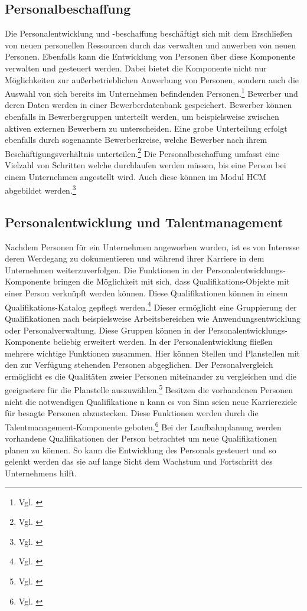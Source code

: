 \subsection{Personalbeschaffung}
Die Personalentwicklung und -beschaffung beschäftigt sich mit dem Erschließen von neuen personellen Ressourcen durch das verwalten und anwerben von neuen Personen.
Ebenfalls kann die Entwicklung von Personen über diese Komponente verwalten und gesteuert werden.
Dabei bietet die Komponente nicht nur Möglichkeiten zur außerbetrieblichen Anwerbung von Personen, sondern auch die Auswahl von sich bereits im Unternehmen befindenden Personen.\footnote{Vgl. \cite{SSSUM2019a}}
Bewerber und deren Daten werden in einer Bewerberdatenbank gespeichert.
Bewerber können ebenfalls in Bewerbergruppen unterteilt werden, um beispielsweise zwischen aktiven externen Bewerbern zu unterscheiden.
Eine grobe Unterteilung erfolgt ebenfalls durch sogenannte Bewerberkreise, welche Bewerber nach ihrem Beschäftigungsverhältnis unterteilen.\footnote{Vgl. \cite{SSSUM2019}}
Die Personalbeschaffung umfasst eine Vielzahl von Schritten welche durchlaufen werden müssen, bis eine Person bei einem Unternehmen angestellt wird.
Auch diese können im Modul HCM abgebildet werden.\footnote{Vgl. \cite{SSSUM2019a}}

\subsection{Personalentwicklung und Talentmanagement}
Nachdem Personen für ein Unternehmen angeworben wurden, ist es von Interesse deren Werdegang zu dokumentieren und während ihrer Karriere in dem Unternehmen weiterzuverfolgen.
Die Funktionen in der Personalentwicklungs-Komponente bringen die Möglichkeit mit sich, dass Qualifikations-Objekte mit einer Person verknüpft werden können. Diese Qualifikationen können in einem Qualifikations-Katalog gepflegt werden.\footnote{Vgl. \cite{SSSUM2019a}}
Dieser ermöglicht eine Gruppierung der Qualifikationen nach beispielsweise Arbeitsbereichen wie Anwendungsentwicklung oder Personalverwaltung.
Diese Gruppen können in der Personalentwicklungs-Komponente beliebig erweitert werden.
In der Personalentwicklung fließen mehrere wichtige Funktionen zusammen.
Hier können Stellen und Planstellen mit den zur Verfügung stehenden Personen abgeglichen.
Der Personalvergleich ermöglicht es die Qualitäten zweier Personen miteinander zu vergleichen und die geeignetere für die Planstelle auszuwählen.\footnote{Vgl. \cite{SSSUM2019a}}
Besitzen die vorhandenen Personen nicht die notwendigen Qualifikatione
n kann es von Sinn seien neue Karriereziele für besagte Personen abzustecken.
Diese Funktionen werden durch die Talentmanagement-Komponente geboten.\footnote{Vgl. \cite{SSSUM2019}}
Bei der Laufbahnplanung werden vorhandene Qualifikationen der Person betrachtet um neue Qualifikationen planen zu können.
So kann die Entwicklung des Personals gesteuert und so gelenkt werden das sie auf lange Sicht dem Wachstum und Fortschritt des Unternehmens hilft.

